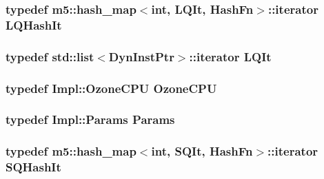\label{classOzoneLWLSQ_a8b43ca5318a59872c61492868e50bab6}
\hypertarget{classOzoneLWLSQ_ac0ca3d8ca19168e251c7233ec1f9a171}{
\subsubsection[{LQHashIt}]{\setlength{\rightskip}{0pt plus 5cm}typedef m5::hash\_\-map$<$int, {\bf LQIt}, {\bf HashFn}$>$::iterator {\bf LQHashIt}}}
\label{classOzoneLWLSQ_ac0ca3d8ca19168e251c7233ec1f9a171}
\hypertarget{classOzoneLWLSQ_a363c8c15e054d23b34f72063429933b8}{
\subsubsection[{LQIt}]{\setlength{\rightskip}{0pt plus 5cm}typedef {\bf std::list}$<${\bf DynInstPtr}$>$::iterator {\bf LQIt}}}
\label{classOzoneLWLSQ_a363c8c15e054d23b34f72063429933b8}
\hypertarget{classOzoneLWLSQ_a9730cc41bccb218cae8f32869b8d887e}{
\subsubsection[{OzoneCPU}]{\setlength{\rightskip}{0pt plus 5cm}typedef Impl::OzoneCPU {\bf OzoneCPU}}}
\label{classOzoneLWLSQ_a9730cc41bccb218cae8f32869b8d887e}
\hypertarget{classOzoneLWLSQ_a818e103eae798a24a06a0a34631849ea}{
\subsubsection[{Params}]{\setlength{\rightskip}{0pt plus 5cm}typedef Impl::Params {\bf Params}}}
\label{classOzoneLWLSQ_a818e103eae798a24a06a0a34631849ea}
\hypertarget{classOzoneLWLSQ_af476de7b08376a4d7d7cd4b8dbbabb7a}{
\subsubsection[{SQHashIt}]{\setlength{\rightskip}{0pt plus 5cm}typedef m5::hash\_\-map$<$int, {\bf SQIt}, {\bf HashFn}$>$::iterator {\bf SQHashIt}}}
